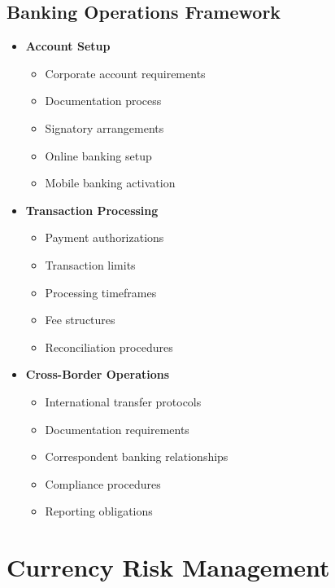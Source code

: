 \subsection{Banking Operations Framework}\label{subsec:banking-operations-framework}
\begin{tcolorbox}[colback=white,colframe=primarydark,title=\textbf{Banking Operations Components}]
\begin{itemize}
    \item \textbf{Account Setup}
    \begin{itemize}
        \item Corporate account requirements
        \item Documentation process
        \item Signatory arrangements
        \item Online banking setup
        \item Mobile banking activation
    \end{itemize}

    \item \textbf{Transaction Processing}
    \begin{itemize}
        \item Payment authorizations
        \item Transaction limits
        \item Processing timeframes
        \item Fee structures
        \item Reconciliation procedures
    \end{itemize}

    \item \textbf{Cross-Border Operations}
    \begin{itemize}
        \item International transfer protocols
        \item Documentation requirements
        \item Correspondent banking relationships
        \item Compliance procedures
        \item Reporting obligations
    \end{itemize}
\end{itemize}
\end{tcolorbox}

\FloatBarrier
\section{Currency Risk Management}\label{sec:currency-risk-management}

